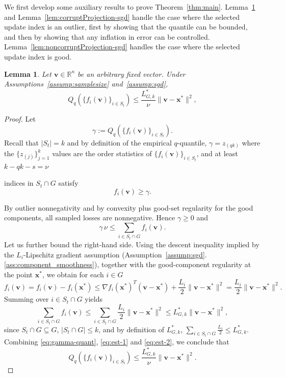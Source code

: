 \documentclass[11pt]{article}
\newcommand{\ve}[1]{\mathbf{#1}}
\newtheorem{lem}{Lemma}
\begin{document}
We first develop some auxiliary results to prove Theorem~\ref{thm:main}.
Lemma~\ref{lem:quantilebound-sgd} and Lemma~\ref{lem:corruptProjection-sgd}  handle the case where the selected update index is an outlier, first by showing that the quantile can be bounded, and then by showing that any inflation in error can be controlled. Lemma~\ref{lem:noncorruptProjection-sgd} handles the case where the selected update index is good.

\begin{lem}\label{lem:quantilebound-sgd}
Let $\ve{v}\in\mathbb{R}^n$ be an arbitrary fixed vector. Under {Assumptions~\ref{assump:samplesize} and~\ref{assump:sgd}},
\[
Q_q(\{f_i(\ve{v})\}_{i\in S_t})
\le
\frac{L_{G,k}^*}{\nu}
\|\ve{v}-\ve{x}^*\|^2,
\]
\end{lem}

\begin{proof}
Let
\begin{equation}\label{eq:gamma-quant}
\gamma:=Q_q(\{f_i(\ve{v})\}_{i\in S_t}).
\end{equation}
Recall that $|S_t| = k$ and by definition
of the empirical $q$-quantile,
{$
\gamma=z_{( qk )}$} {where the $\{z_{(j)}\}_{j=1}^k$ values are the order statistics of $\{f_i(\ve{v})\}_{i \in S_t}$}, and
at least
{$
k- qk -s
=
\nu
$}

indices in $S_t\cap G$ satisfy
\[
f_i(\ve{v})\ge \gamma.
\]

By outlier nonnegativity and by convexity plus good-set {regularity} for the good components, all sampled losses are nonnegative. Hence $\gamma\ge 0$ and
\begin{equation}\label{eq:est-1}
\gamma\,\nu
\le
\sum_{i\in S_t\cap G} f_i(\ve{v}).
\end{equation}
Let us further bound the right-hand side. Using the descent inequality implied by the $L_i$-Lipschitz gradient assumption {(Assumption~\ref{assump:sgd}.\ref{ass:component_smoothness})}, together with the good-component regularity at the point $\ve{x}^*$, we obtain for each $i\in G$
\[
{f_i(\ve{v}) =} f_i(\ve{v})-f_i(\ve{x}^*)
\le
\nabla f_i(\ve{x}^*)^T(\ve{v}-\ve{x}^*)
+
\frac{L_i}{2}\|\ve{v}-\ve{x}^*\|^2
=
\frac{L_i}{2}\|\ve{v}-\ve{x}^*\|^2.
\]
Summing over $i\in S_t\cap G$ yields
\begin{equation}\label{eq:est-2}
\sum_{i\in S_t\cap G} f_i(\ve{v})
\le
\sum_{i\in S_t\cap G}
\frac{L_i}{2}\|\ve{v}-\ve{x}^*\|^2 \le L_{G,k}^*
\|\ve{v}-\ve{x}^*\|^2,
\end{equation}
since $S_t\cap G\subseteq G$, $|S_t\cap G|\le k$, and by definition of
$L_{G,k}^*$,
$
\sum\limits_{i\in S_t\cap G}
\frac{L_i}{2}
\le
L_{G,k}^*.$
Combining \eqref{eq:gamma-quant}, \eqref{eq:est-1} and \eqref{eq:est-2}, we conclude that
\[
Q_q(\{f_i(\ve{v})\}_{i\in S_t})
\le
\frac{L_{G,k}^*}{\nu}
\|\ve{v}-\ve{x}^*\|^2.
\]
\end{proof}
\end{document}
